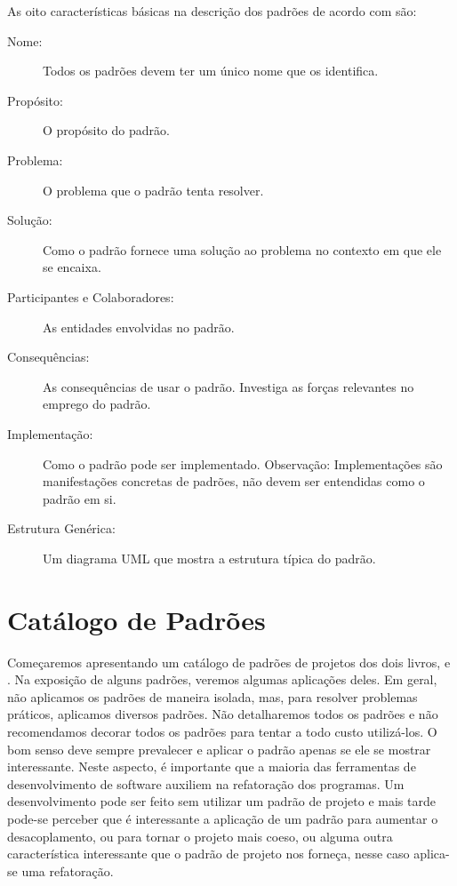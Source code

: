 As oito características básicas na descrição dos padrões de acordo com  são:
\begin{description}
\item[Nome:] Todos os padrões devem ter um único nome que os identifica.

\item[Propósito:] O propósito do padrão.

\item[Problema:] O problema que o padrão tenta resolver.

\item[Solução:] Como o padrão fornece uma solução ao problema no contexto em que ele se encaixa.

\item[Participantes e Colaboradores:] As entidades envolvidas no padrão.

\item[Consequências:] As consequências de usar o padrão. Investiga as forças relevantes no emprego do padrão.

\item[Implementação:] Como o padrão pode ser implementado. Observação: Implementações são manifestações concretas de padrões, não devem ser entendidas como o padrão em si.

\item[Estrutura Genérica:] Um diagrama UML que mostra a estrutura típica do padrão.

\end{description}

\section{Catálogo de Padrões}

Começaremos apresentando um catálogo de padrões de projetos dos dois livros, \cite{design:patterns} e \cite{DP:explained}. Na exposição de alguns padrões, veremos algumas aplicações deles. Em geral, não aplicamos os padrões de maneira isolada, mas, para resolver problemas práticos, aplicamos diversos padrões. Não detalharemos todos os padrões e não recomendamos decorar todos os padrões para tentar a todo custo utilizá-los. O bom senso deve sempre prevalecer e aplicar o padrão apenas se ele se mostrar interessante. Neste aspecto, é importante que a maioria das ferramentas de desenvolvimento de software auxiliem na refatoração dos programas. Um desenvolvimento pode ser feito sem utilizar um padrão de projeto e mais tarde pode-se perceber que é interessante a aplicação de um padrão para aumentar o desacoplamento, ou para tornar o projeto mais coeso, ou alguma outra característica interessante que o padrão de projeto nos forneça, nesse caso aplica-se uma refatoração.


